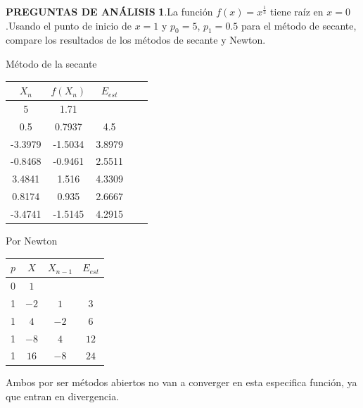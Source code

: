 \documentclass[12pt]{article}
\begin{document}
\large\textbf{PREGUNTAS DE ANÁLISIS}
\normalsize\newline
\textbf{1}.La función $f(x) = x^{\frac{1}{3}}$ tiene raíz en $x = 0$.Usando el punto de inicio de $x = 1$ y $p_0 = 5$, $p_1 = 0.5$ para el método de secante, compare los resultados de los métodos de secante y Newton.

Método de la secante

\begin{center}
    \begin{tabular}{|c|c|c|c|c|}
        \hline
        $X_n$&$f(X_n)$&$E_{est}$\\
        \hline
        5        &1.71&  \\
        0.5     &0.7937&4.5\\
        -3.3979  &-1.5034&3.8979\\
        -0.8468  &-0.9461&2.5511\\
        3.4841  &1.516&4.3309\\
        0.8174  &0.935&2.6667\\
        -3.4741  &-1.5145&4.2915\\
        \hline
      \end{tabular} 
\end{center}

Por Newton

\begin{center}
    \begin{tabular}{|c|c|c|c|}
        \hline
        $p$&$X$&$X_{n-1}$&$E_{est}$\\
        \hline
        0 & $1$&  & \\
        1 &$-2$&$1$&$3$\\
        1 &$4$&$-2$&$6$\\
        1 &$-8$&$4$&$12$\\
        1 &$16$&$-8$&$24$\\
        \hline
      \end{tabular} 
\end{center}


Ambos por ser métodos abiertos no van a converger en esta especifica función, ya que entran en divergencia.
\vspace{0.5cm}


\renewcommand{\refname}{\MakeUppercase{REFERENCIAS}}


\end{document}
